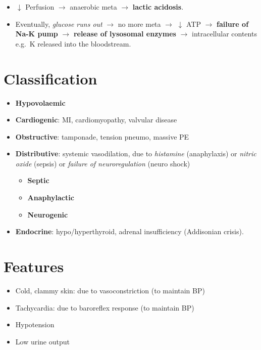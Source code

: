 \documentclass[
  12pt,
]{memoir}
\providecommand{\tightlist}{%
  \setlength{\itemsep}{0pt}\setlength{\parskip}{0pt}}
\begin{document}
\begin{itemize}
\tightlist
\item
  \(\downarrow\) Perfusion \(\rightarrow\) anaerobic meta
  \(\rightarrow\) \textbf{lactic acidosis}.
\item
  Eventually, \emph{glucose runs out} \(\rightarrow\) no more meta
  \(\rightarrow\) \(\downarrow\) ATP \(\rightarrow\) \textbf{failure of
  Na-K pump} \(\rightarrow\) \textbf{release of lysosomal enzymes}
  \(\rightarrow\) intracellular contents e.g.~K released into the
  bloodstream.
\end{itemize}

\hypertarget{classification}{%
\section{Classification}\label{classification}}

\begin{itemize}
\tightlist
\item
  \textbf{Hypovolaemic}
\item
  \textbf{Cardiogenic}: MI, cardiomyopathy, valvular disease
\item
  \textbf{Obstructive}: tamponade, tension pneumo, massive PE
\item
  \textbf{Distributive}: systemic vasodilation, due to \emph{histamine}
  (anaphylaxis) or \emph{nitric oxide} (sepsis) or \emph{failure of
  neuroregulation} (neuro shock)

  \begin{itemize}
  \tightlist
  \item
    \textbf{Septic}
  \item
    \textbf{Anaphylactic}
  \item
    \textbf{Neurogenic}
  \end{itemize}
\item
  \textbf{Endocrine}: hypo/hyperthyroid, adrenal insufficiency
  (Addisonian crisis).
\end{itemize}

\hypertarget{features}{%
\section{Features}\label{features}}

\begin{itemize}
\tightlist
\item
  Cold, clammy skin: due to vasoconstriction (to maintain BP)
\item
  Tachycardia: due to baroreflex response (to maintain BP)
\item
  Hypotension
\item
  Low urine output
\end{itemize}
\end{document}
